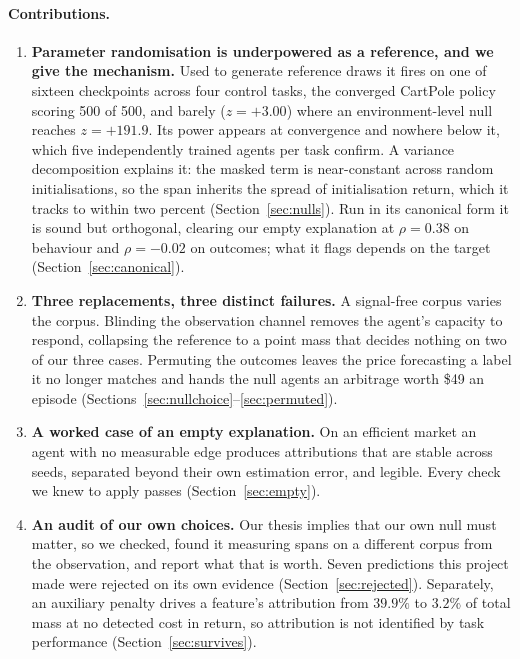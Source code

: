 \documentclass[10pt,twocolumn]{article}
\newcommand{\elsewhere}[1]{Section~\ref{#1}}
\begin{document}
\paragraph{Contributions.}
\begin{enumerate}[leftmargin=1.2em,itemsep=1pt,topsep=2pt]
\item \textbf{Parameter randomisation is underpowered as a reference, and we give
the mechanism.} Used to generate reference draws it fires on one of sixteen
checkpoints across four control tasks, the converged CartPole policy scoring 500
of 500, and barely ($z=+3.00$) where an environment-level null reaches
$z=+191.9$. Its power appears at convergence and nowhere below it, which five
independently trained agents per task confirm. A
variance decomposition explains it: the masked term is near-constant across
random initialisations, so the span inherits the spread of initialisation
return, which it tracks to within two percent (Section~\ref{sec:nulls}).
Run in its canonical form \citep{adebayo2018sanity} it is sound but orthogonal,
clearing our empty explanation at $\rho=0.38$ on behaviour and $\rho=-0.02$ on
outcomes; what it flags depends on the target
(Section~\ref{sec:canonical}).

\item \textbf{Three replacements, three distinct failures.} A signal-free corpus
varies the corpus. Blinding the observation channel removes the agent's capacity
to respond, collapsing the reference to a point mass that decides nothing on
two of our three cases. Permuting the outcomes leaves the price forecasting
a label it no longer matches and hands the null agents an arbitrage worth \$49
an episode (Sections~\ref{sec:nullchoice}--\ref{sec:permuted}).

\item \textbf{A worked case of an empty explanation.} On an efficient market an
agent with no measurable edge produces attributions that are stable across
seeds, separated beyond their own estimation error, and legible. Every check we
knew to apply passes (Section~\ref{sec:empty}).

\item \textbf{An audit of our own choices.} Our thesis implies that our own null
must matter, so we checked, found it measuring spans on a different corpus from
the observation, and report what that is worth. Seven predictions this project
made were rejected on its own evidence
(\elsewhere{sec:rejected}). Separately, an auxiliary penalty drives a
feature's attribution from $39.9\%$ to $3.2\%$ of total mass at no detected
cost in return, so attribution is not identified by task performance
(\elsewhere{sec:survives}).
\end{enumerate}
\end{document}

